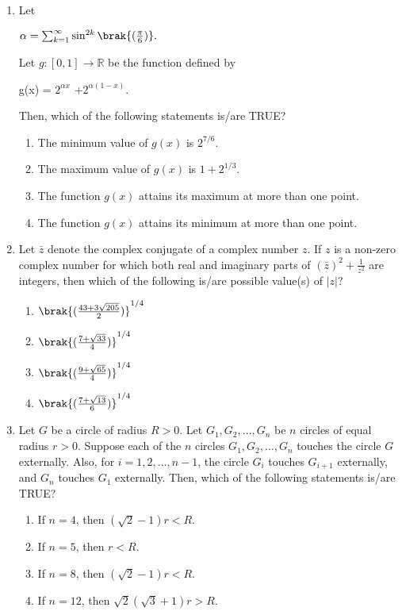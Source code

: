 \documentclass{article}
\begin{document}
\begin{enumerate}
    \item Let 
	    
    $\alpha = \sum_{k=1}^{\infty} \sin^{2k} \brak{(\frac{\pi}{6} )}.$
	    

    Let $g: [0,1] \to \mathbb{R}$ be the function defined by 
    
    g(x) = $2^{\alpha x}$ +$ 2^{\alpha(1 - x)}$.
    
    Then, which of the following statements is/are TRUE?

    \begin{enumerate}
        \item The minimum value of $g(x)$ is $2^{7/6}$.
        \item The maximum value of $g(x)$ is $1 + 2^{1/3}$.
        \item The function $g(x)$ attains its maximum at more than one point.
        \item The function $g(x)$ attains its minimum at more than one point.
    \end{enumerate}



\item Let $\bar{z}$ denote the complex conjugate of a complex number $z$. If $z$ is a non-zero complex number for which both real and imaginary parts of 
$(\bar{z})^2 + \frac{1}{z^2}$ are integers, then which of the following is/are possible value(s) of $|z|$?

    \begin{enumerate}
	    \item $\brak{(\frac{43 + 3\sqrt{205}}{2})}^{1/4}$
	    \item $\brak{(\frac{7 + \sqrt{33}}{4})}^{1/4}$
	    \item $\brak{(\frac{9 + \sqrt{65}}{4})}^{1/4}$
	    \item $\brak{(\frac{7 + \sqrt{13}}{6})}^{1/4}$
    \end{enumerate}

    

    \item Let $G$ be a circle of radius $R > 0$. Let $G_1, G_2, \dots, G_n$ be $n$ circles of equal radius $r > 0$. Suppose each of the $n$ circles $G_1, G_2, \dots, G_n$ touches the circle $G$ externally. Also, for $i = 1, 2, \dots, n - 1$, the circle $G_i$ touches $G_{i+1}$ externally, and $G_n$ touches $G_1$ externally. Then, which of the following statements is/are TRUE?

    \begin{enumerate}
        \item If $n = 4$, then $(\sqrt{2} - 1)r < R$.
        \item If $n = 5$, then $r < R$.
        \item If $n = 8$, then $(\sqrt{2} - 1) r < R$.
        \item If $n = 12$, then $\sqrt{2} (\sqrt{3} + 1) r > R$.
    \end{enumerate}




\end{enumerate}
\end{document}
